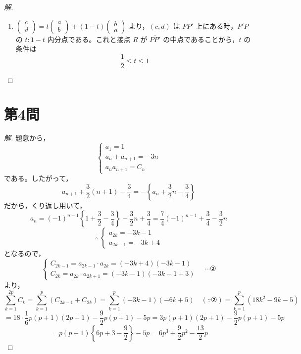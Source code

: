 \documentclass[../main.tex]{subfiles}
\begin{document}
\begin{proof}[解]
\begin{enumerate}
    \item[(2)] $
      \begin{pmatrix}c\\d
      \end{pmatrix}=t
      \begin{pmatrix}a\\b
      \end{pmatrix}+(1-t)
      \begin{pmatrix}b\\a
      \end{pmatrix}$ より，$(c,d)$ は $\overline{PP'}$ 上にある時，$P'P$ の $t:1-t$ 内分点である。これと接点 $R$ が $\overline{PP'}$ の中点であることから，$t$ の条件は
      \[
        \frac12\le t\le1
      \]
  \end{enumerate}
\end{proof}

\newpage

\section*{第4問}

\begin{proof}[解]
  題意から，
  \[
    \begin{cases}
      a_1=1 \\
      a_n+a_{n+1}=-3n \\
      a_na_{n+1}=C_n
    \end{cases}
  \]
  である。したがって，
  \[
    a_{n+1}+\frac32(n+1)-\frac34=-\left\{a_n+\frac32n-\frac34\right\}
  \]
  だから，くり返し用いて，
  \[
    a_n=(-1)^{n-1}\left\{1+\frac32-\frac34\right\}-\frac32n+\frac34 = \frac74(-1)^{n-1}+\frac34-\frac32n
  \]
  \[
    \therefore\
    \begin{cases}
      a_{2k}=-3k-1 \\
      a_{2k-1}=-3k+4
    \end{cases}
  \]
  となるので，
  \[
    \begin{cases}
      C_{2k-1}=a_{2k-1}\cdot a_{2k}=(-3k+4)(-3k-1) \\
      C_{2k}=a_{2k}\cdot a_{2k+1}=(-3k-1)(-3k-1+3)
    \end{cases}
    \quad \cdots \text{②}
  \]
  より，
  \[
    \sum_{k=1}^{2p}C_k=\sum_{k=1}^{p}(C_{2k-1}+C_{2k}) = \sum_{k=1}^{p}(-3k-1)(-6k+5) \quad (\because②) = \sum_{k=1}^{p}(18k^2-9k-5)
  \]
  \[
    =18\cdot\frac16 p(p+1)(2p+1)-\frac92p(p+1)-5p = 3p(p+1)(2p+1)-\frac92p(p+1)-5p
  \]
  \[
    =p(p+1)\left\{6p+3-\frac92\right\}-5p = 6p^3+\frac92p^2-\frac{13}{2}p
  \]
\end{proof}
\end{document}
